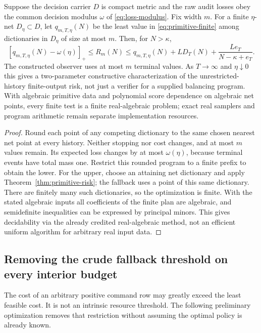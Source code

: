\begin{corollary}\label{cor:primitive-width}
Suppose the decision carrier $D$ is compact metric and the raw audit losses obey the common decision modulus $\omega$ of \eqref{eq:loss-modulus}. Fix width $m$. For a finite $\eta$-net $D_\eta\subset D$, let $q_{m,T,\eta}(N)$ be the least value in \eqref{eq:primitive-finite} among dictionaries in $D_\eta$ of size at most $m$. Then, for $N>\kappa$,
\[
 [q_{m,T,\eta}(N)-\omega(\eta)]_+
 \le R_m(N)\le q_{m,T,\eta}(N)+LD_T(N)
                         +\frac{Le_T}{N-\kappa+e_T}.
\]
The constructed observer uses at most $m$ terminal values. As $T\to\infty$ and $\eta\downarrow0$ this gives a two-parameter constructive characterization of the unrestricted-history finite-output risk, not just a verifier for a supplied balancing program. With algebraic primitive data and polynomial score dependence on algebraic net points, every finite test is a finite real-algebraic problem; exact real samplers and program arithmetic remain separate implementation resources.
\end{corollary}
\begin{proof}
Round each point of any competing dictionary to the same chosen nearest net point at every history. Neither stopping nor cost changes, and at most $m$ values remain. Its expected loss changes by at most $\omega(\eta)$, because terminal events have total mass one. Restrict this rounded program to a finite prefix to obtain the lower. For the upper, choose an attaining net dictionary and apply Theorem~\ref{thm:primitive-risk}; the fallback uses a point of this same dictionary. There are finitely many such dictionaries, so the optimization is finite. With the stated algebraic inputs all coefficients of the finite plan are algebraic, and semidefinite inequalities can be expressed by principal minors. This gives decidability via the already credited real-algebraic method, not an efficient uniform algorithm for arbitrary real input data.
\end{proof}

\subsection{Removing the crude fallback threshold on every interior budget}
The cost of an arbitrary positive command row may greatly exceed the least feasible cost. It is not an intrinsic resource threshold. The following preliminary optimization removes that restriction without assuming the optimal policy is already known.

